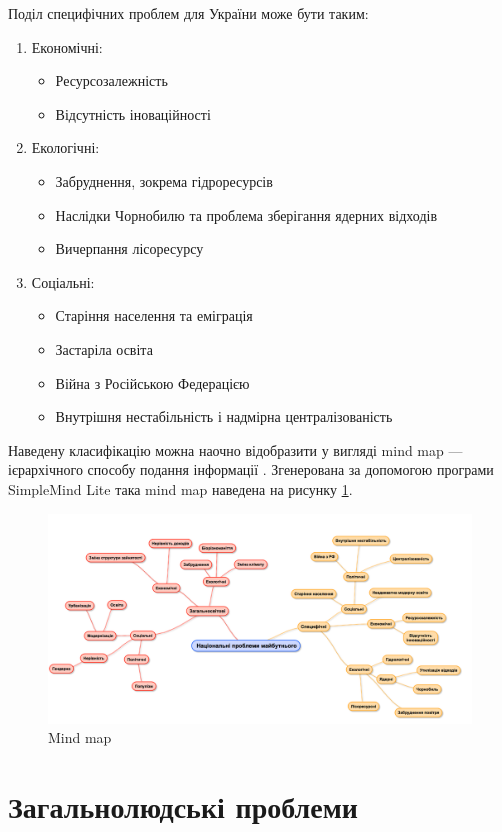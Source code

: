         Поділ специфічних проблем для України може бути таким:

        \begin{enumerate}
            \item Економічні:
            \begin{itemize}
                \item Ресурсозалежність
                \item Відсутність іноваційності
            \end{itemize}

            \item Екологічні:
            \begin{itemize}
                \item Забруднення, зокрема гідроресурсів
                \item Наслідки Чорнобилю та проблема зберігання ядерних відходів
                \item Вичерпання лісоресурсу
            \end{itemize}

            \item Соціальні:
            \begin{itemize}
                \item Старіння населення та еміграція
                \item Застаріла освіта
                \item Війна з Російською Федерацією
                \item Внутрішня нестабільність і надмірна централізованість
            \end{itemize}
        \end{enumerate}

        Наведену класифікацію можна наочно відобразити у вигляді mind map --- ієрархічного
        способу подання інформації \cite{hopper2015practicing}. Згенерована за
        допомогою програми SimpleMind Lite \cite{simplemind} така mind map наведена на рисунку \ref{fig:mindmap}.

        \begin{figure}[!htp]
            \centering
            \includegraphics[scale = 0.5]{PNG/mindmap.png}
            \caption{Mind map}
            \label{fig:mindmap}
        \end{figure}

    \section{Загальнолюдські проблеми}\label{sec:world}